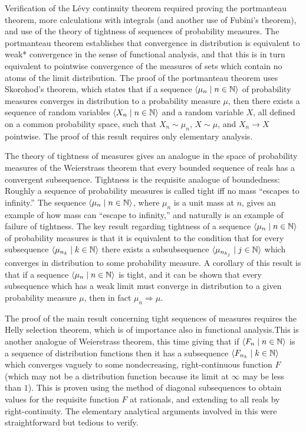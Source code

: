 \documentclass{amsart}
\theoremstyle{definition}
\theoremstyle{remark}
\newcommand{\bldseq}[2]{\langle{#1}\mid{#2}\rangle}
\begin{document}
Verification of the L\'evy continuity theorem required proving the portmanteau theorem, more calculations with integrals (and another use of Fubini's theorem), and use of the theory of tightness of sequences of probability measures. The portmanteau theorem establishes that convergence in distribution is equivalent to weak* convergence in the sense of functional analysis, and that this is in turn equivalent to pointwise convergence of the measures of sets which contain no atoms of the limit distribution. The proof of the portmanteau theorem uses Skorohod's theorem, which states that if a sequence $\bldseq{\mu_n}{n \in \N}$ of probability measures converges in distribution to a probability measure $\mu$, then there exists a sequence of random variables $\bldseq{X_n}{n \in \N}$ and a random variable $X$, all defined on a common probability space, such that $X_n \sim \mu_n$, $X \sim \mu$, and $X_n \rightarrow X$ pointwise. The proof of this result requires only elementary analysis.

The theory of tightness of measures gives an analogue in the space of probability measures of the Weierstrass theorem that every bounded sequence of reals has a convergent subsequence. Tightness is the requisite analogue of boundedness: Roughly a sequence of probability measures is called tight iff no mass ``escapes to infinity.'' The sequence $\bldseq{\mu_n}{n \in \N}$, where $\mu_n$ is a unit mass at $n$, gives an example of how mass can ``escape to infinity,'' and naturally is an example of failure of tightness. The key result regarding tightness of a sequence $\bldseq{\mu_n}{n \in \N}$ of probability measures is that it is equivalent to the condition that for every subsequence $\bldseq{\mu_{n_k}}{k \in \N}$ there exists a subsubsequence $\bldseq{\mu_{n_{k_j}}}{j \in \N}$ which converges in distribution to some probability measure. A corollary of this result is that if a sequence $\bldseq{\mu_n}{n \in \N}$ is tight, and it can be shown that every subsequence which has a weak limit must converge in distribution to a given probability measure $\mu$, then in fact $\mu_n \Rightarrow \mu$.

The proof of the main result concerning tight sequences of measures requires the Helly selection theorem, which is of importance also in functional analysis.This is another analogue of Weierstrass theorem, this time giving that if $\bldseq{F_n}{n \in \N}$ is a sequence of distribution functions then it has a subsequence $\bldseq{F_{n_k}}{k \in \N}$ which converges vaguely to some nondecreasing, right-continuous function $F$ (which may not be a distribution function because its limit at $\infty$ may be less than $1$). This is proven using the method of diagonal subsequences to obtain values for the requisite function $F$ at rationals, and extending to all reals by right-continuity. The elementary analytical arguments involved in this were straightforward but tedious to verify.
\end{document}
